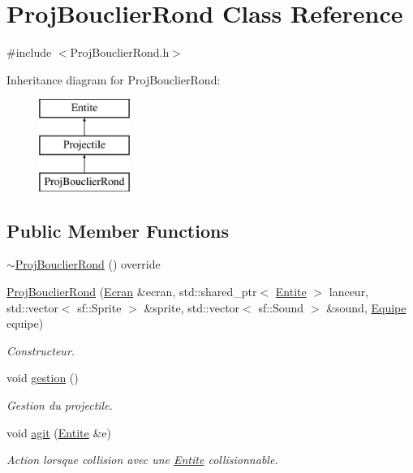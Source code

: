 \hypertarget{class_proj_bouclier_rond}{}\section{Proj\+Bouclier\+Rond Class Reference}
\label{class_proj_bouclier_rond}


{\ttfamily \#include $<$Proj\+Bouclier\+Rond.\+h$>$}

Inheritance diagram for Proj\+Bouclier\+Rond\+:\begin{figure}[H]
\begin{center}
\leavevmode
\includegraphics[height=3.000000cm]{class_proj_bouclier_rond}
\end{center}
\end{figure}
\subsection*{Public Member Functions}
\begin{DoxyCompactItemize}
\item 
\mbox{\hyperlink{class_proj_bouclier_rond_a4cbfae3e14164be2b345efaeac0b3abd}{$\sim$\+Proj\+Bouclier\+Rond}} () override
\item 
\mbox{\hyperlink{class_proj_bouclier_rond_ac0ace14849356b453582614a006116b5}{Proj\+Bouclier\+Rond}} (\mbox{\hyperlink{class_ecran}{Ecran}} \&ecran, std\+::shared\+\_\+ptr$<$ \mbox{\hyperlink{class_entite}{Entite}} $>$ lanceur, std\+::vector$<$ sf\+::\+Sprite $>$ \&sprite, std\+::vector$<$ sf\+::\+Sound $>$ \&sound, \mbox{\hyperlink{constantes_8h_a08fa5554288d5031a8f3bb83cc04ee83}{Equipe}} equipe)
\begin{DoxyCompactList}\small\item\em Constructeur. \end{DoxyCompactList}\item 
void \mbox{\hyperlink{class_proj_bouclier_rond_a13656b7dbcd9cac9a5df9baeab430103}{gestion}} ()
\begin{DoxyCompactList}\small\item\em Gestion du projectile. \end{DoxyCompactList}\item 
void \mbox{\hyperlink{class_proj_bouclier_rond_a60547ae68c6862f6e4c8b9cdd94bb52b}{agit}} (\mbox{\hyperlink{class_entite}{Entite}} \&e)
\begin{DoxyCompactList}\small\item\em Action lorsque collision avec une \mbox{\hyperlink{class_entite}{Entite}} collisionnable. \end{DoxyCompactList}\end{DoxyCompactItemize}
